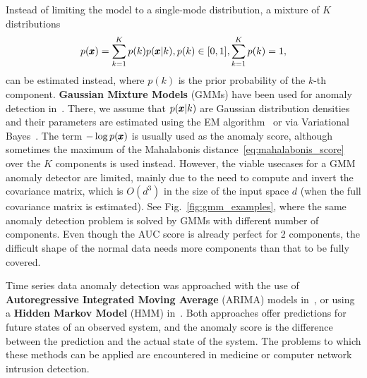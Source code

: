 Instead of limiting the model to a single-mode distribution, a mixture of $K$ distributions 
\begin{equation} \label{eq:mixture}
	p(\pmb{{x}}) = \sum_{k=1}^K p(k) p(\pmb{{x}}|k), p(k) \in [0,1], \sum_{k=1}^K p(k) = 1,
\end{equation}
can be estimated instead, where $p(k)$ is the prior probability of the $k$-th component. \textbf{Gaussian Mixture Models} (GMMs) have been used for anomaly detection in~\cite{roberts1994probabilistic,mahadevan2010anomaly}. There, we assume that $p(\pmb{{x}}|k)$ are Gaussian distribution densities and their parameters are estimated using the EM algorithm~\cite{dempster1977maximum} or via Variational Bayes~\cite{bishop2006pattern}. The term $-\log p(\pmb{{x}})$ is usually used as the anomaly score, although sometimes the maximum of the Mahalabonis distance~\eqref{eq:mahalabonis_score} over the $K$ components is used instead. However, the viable usecases for a GMM anomaly detector are limited, mainly due to the need to compute and invert the covariance matrix, which is $O(d^3)$ in the size of the input space $d$ (when the full covariance matrix is estimated). See Fig.~\ref{fig:gmm_examples}, where the same anomaly detection problem is solved by GMMs with different number of components. Even though the AUC score is already perfect for 2 components, the difficult shape of the normal data needs more components than that to be fully covered.

Time series data anomaly detection was approached with the use of \textbf{Autoregressive Integrated Moving Average} (ARIMA) models in~\cite{roberts1994probabilistic,hoare2002line}, or using a \textbf{Hidden Markov Model} (HMM) in~\cite{yeung2003host,zhang2003new}. Both approaches offer predictions for future states of an observed system, and the anomaly score is the difference between the prediction and the actual state of the system. The problems to which these methods can be applied are encountered in medicine or computer network intrusion detection.

